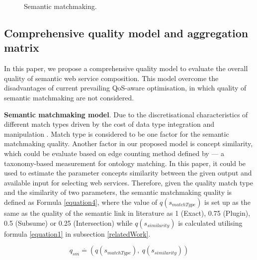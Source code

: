 \documentclass{llncs}
\begin{document}
\begin{figure}[h]
\centerline{
}
 \caption{Semantic matchmaking.}
 \label{matchmaking}
\end{figure}

\subsection{Comprehensive quality model and aggregation matrix}\label{qualityModel}
In this paper, we propose a comprehensive quality model to evaluate the overall quality of semantic web service composition. This model overcome the disadvantages of current prevailing QoS-aware optimisation, in which quality of semantic matchmaking are not considered.

\textbf{Semantic matchmaking model}. Due to the discretisational characteristics of different match types driven by the cost of  data type integration and manipulation \cite{lecue2009optimizing}. Match type is considered to be one factor for the semantic matchmaking quality. Another factor in our proposed model is concept similarity, which could be evaluate based on edge counting method defined by \cite{shet2012new} --- a taxonomy-based measurement for ontology matching. In this paper, it could be used to estimate the parameter concepts similarity between the given output and available input for selecting web services. Therefore, given the quality match type and the similarity of two parameters, the semantic matchmaking quality is defined as Formula \ref{equation4}, where the value of $q(s_ {matchType})$ is set up as the same as the quality of the semantic link in literature \cite{lecue2009optimizing} as 1 (Exact), 0.75 (Plugin), 0.5 (Subsume) or 0.25 (Intersection) while $q(s_ {similarity})$ is calculated utilising formula \ref{equation1} in subsection \ref{relatedWork}.

\begin{equation}
\label{equation4}
q_{sm} \stackrel{.}{=} (q(s_ {matchType}), \  q(s_ {similarity}))
\end{equation}
\end{document}
